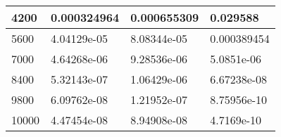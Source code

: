 \documentclass{article}
\begin{document}
\begin{enumerate}
\begin{table}[ht]
{\begin{tabular}{llll}
  \multicolumn{1}{|l|}{4200}  & \multicolumn{1}{l|}{0.000324964}  & \multicolumn{1}{l|}{0.000655309}  & \multicolumn{1}{l|}{0.029588} \\ \hline
  \multicolumn{1}{|l|}{5600}  & \multicolumn{1}{l|}{4.04129e-05}  & \multicolumn{1}{l|}{8.08344e-05}  & \multicolumn{1}{l|}{0.000389454} \\ \hline
  \multicolumn{1}{|l|}{7000}  & \multicolumn{1}{l|}{4.64268e-06}  & \multicolumn{1}{l|}{9.28536e-06}  & \multicolumn{1}{l|}{5.0851e-06} \\ \hline
  \multicolumn{1}{|l|}{8400}  & \multicolumn{1}{l|}{5.32143e-07}  & \multicolumn{1}{l|}{1.06429e-06}  & \multicolumn{1}{l|}{6.67238e-08} \\ \hline
  \multicolumn{1}{|l|}{9800}  & \multicolumn{1}{l|}{6.09762e-08}  & \multicolumn{1}{l|}{1.21952e-07}  & \multicolumn{1}{l|}{8.75956e-10} \\ \hline
  \multicolumn{1}{|l|}{10000} & \multicolumn{1}{l|}{4.47454e-08}  & \multicolumn{1}{l|}{8.94908e-08}  & \multicolumn{1}{l|}{4.7169e-10} \\ \hline
  \end{tabular}
}
\end{table}


\end{enumerate}
\end{document}
